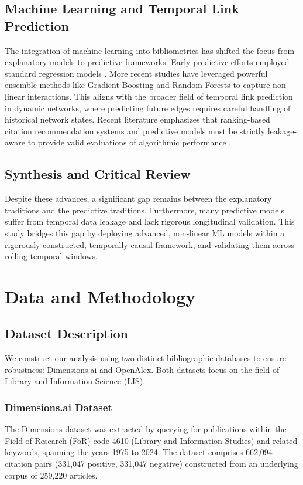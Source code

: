 \documentclass[12pt,a4paper]{article}
\begin{document}
\subsection{Machine Learning and Temporal Link Prediction}
The integration of machine learning into bibliometrics has shifted the focus from explanatory models to predictive frameworks. Early predictive efforts employed standard regression models \cite{lokker2008prediction}. More recent studies have leveraged powerful ensemble methods like Gradient Boosting \cite{natekin2013gradient} and Random Forests \cite{breiman2001random} to capture non-linear interactions. This aligns with the broader field of temporal link prediction in dynamic networks, where predicting future edges requires careful handling of historical network states. Recent literature emphasizes that ranking-based citation recommendation systems and predictive models must be strictly leakage-aware to provide valid evaluations of algorithmic performance \cite{wang2013quantifying}.

\subsection{Synthesis and Critical Review}
Despite these advances, a significant gap remains between the explanatory traditions and the predictive traditions. Furthermore, many predictive models suffer from temporal data leakage and lack rigorous longitudinal validation. This study bridges this gap by deploying advanced, non-linear ML models within a rigorously constructed, temporally causal framework, and validating them across rolling temporal windows.

\section{Data and Methodology}

\subsection{Dataset Description}
We construct our analysis using two distinct bibliographic databases to ensure robustness: Dimensions.ai and OpenAlex. Both datasets focus on the field of Library and Information Science (LIS).

\subsubsection{Dimensions.ai Dataset}
The Dimensions dataset was extracted by querying for publications within the Field of Research (FoR) code 4610 (Library and Information Studies) and related keywords, spanning the years 1975 to 2024. The dataset comprises 662,094 citation pairs (331,047 positive, 331,047 negative) constructed from an underlying corpus of 259,220 articles.
\end{document}

